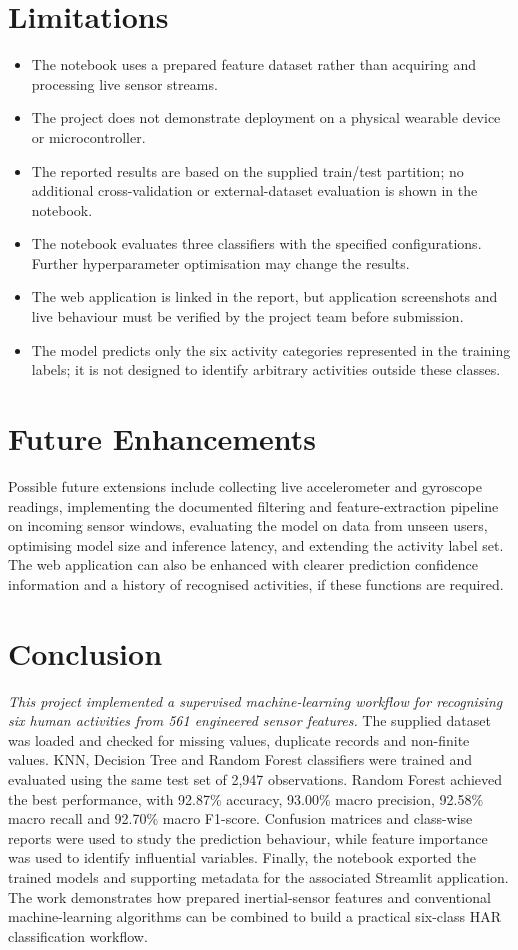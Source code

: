 \section{Limitations}
\begin{itemize}
\item The notebook uses a prepared feature dataset rather than acquiring and processing live sensor streams.
\item The project does not demonstrate deployment on a physical wearable device or microcontroller.
\item The reported results are based on the supplied train/test partition; no additional cross-validation or external-dataset evaluation is shown in the notebook.
\item The notebook evaluates three classifiers with the specified configurations. Further hyperparameter optimisation may change the results.
\item The web application is linked in the report, but application screenshots and live behaviour must be verified by the project team before submission.
\item The model predicts only the six activity categories represented in the training labels; it is not designed to identify arbitrary activities outside these classes.
\end{itemize}

\section{Future Enhancements}
Possible future extensions include collecting live accelerometer and gyroscope readings, implementing the documented filtering and feature-extraction pipeline on incoming sensor windows, evaluating the model on data from unseen users, optimising model size and inference latency, and extending the activity label set. The web application can also be enhanced with clearer prediction confidence information and a history of recognised activities, if these functions are required.

\section{Conclusion}
\emph{This project implemented a supervised machine-learning workflow for recognising six human activities from 561 engineered sensor features.} The supplied dataset was loaded and checked for missing values, duplicate records and non-finite values. KNN, Decision Tree and Random Forest classifiers were trained and evaluated using the same test set of 2,947 observations. Random Forest achieved the best performance, with 92.87\% accuracy, 93.00\% macro precision, 92.58\% macro recall and 92.70\% macro F1-score. Confusion matrices and class-wise reports were used to study the prediction behaviour, while feature importance was used to identify influential variables. Finally, the notebook exported the trained models and supporting metadata for the associated Streamlit application. The work demonstrates how prepared inertial-sensor features and conventional machine-learning algorithms can be combined to build a practical six-class HAR classification workflow.
